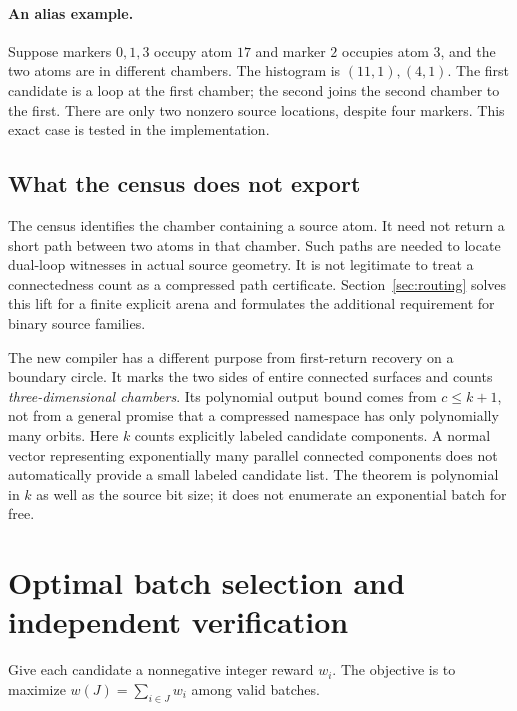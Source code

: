 \documentclass[11pt]{article}
\theoremstyle{definition}
\begin{document}
\paragraph{An alias example.} Suppose markers $0,1,3$ occupy atom $17$ and marker $2$ occupies atom $3$, and the two atoms are in different chambers. The histogram is $(11,1),(4,1)$. The first candidate is a loop at the first chamber; the second joins the second chamber to the first. There are only two nonzero source locations, despite four markers. This exact case is tested in the implementation.

\subsection{What the census does not export}
The census identifies the chamber containing a source atom. It need not return a short path between two atoms in that chamber. Such paths are needed to locate dual-loop witnesses in actual source geometry. It is not legitimate to treat a connectedness count as a compressed path certificate. Section~\ref{sec:routing} solves this lift for a finite explicit arena and formulates the additional requirement for binary source families.

The new compiler has a different purpose from first-return recovery on a boundary circle. It marks the two sides of entire connected surfaces and counts \emph{three-dimensional chambers}. Its polynomial output bound comes from $c\leq k+1$, not from a general promise that a compressed namespace has only polynomially many orbits. Here $k$ counts explicitly labeled candidate components. A normal vector representing exponentially many parallel connected components does not automatically provide a small labeled candidate list. The theorem is polynomial in $k$ as well as the source bit size; it does not enumerate an exponential batch for free.

\section{Optimal batch selection and independent verification}\label{sec:selection}
Give each candidate a nonnegative integer reward $w_i$. The objective is to maximize $w(J)=\sum_{i\in J}w_i$ among valid batches.
\end{document}
